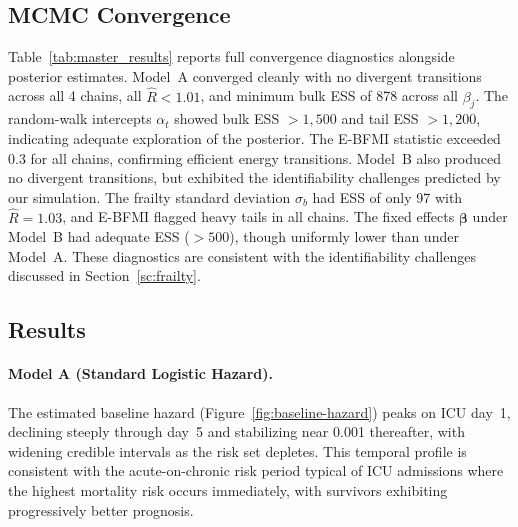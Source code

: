 \documentclass[twoside,11pt]{article}
\begin{document}
 
\subsection{MCMC Convergence}\label{sc:convergence}
Table~\ref{tab:master_results} reports full convergence diagnostics alongside posterior estimates. Model~A converged cleanly with no divergent transitions across all 4 chains, all $\hat{R} < 1.01$, and minimum bulk ESS of 878 across all $\beta_j$. The random-walk intercepts $\alpha_t$ showed bulk ESS $> 1{,}500$ and tail ESS $> 1{,}200$, indicating adequate exploration of the posterior. The E-BFMI statistic exceeded 0.3 for all chains, confirming efficient energy transitions. Model~B also produced no divergent transitions, but exhibited the identifiability challenges predicted by our simulation. The frailty standard deviation $\sigma_b$ had ESS of only 97 with $\hat{R} = 1.03$, and E-BFMI flagged heavy tails in all chains. The fixed effects $\boldsymbol{\beta}$ under Model~B had adequate ESS ($> 500$), though uniformly lower than under Model~A. These diagnostics are consistent with the identifiability challenges discussed in Section~\ref{sc:frailty}.
 
\subsection{Results}
 
\paragraph{Model A (Standard Logistic Hazard).}
The estimated baseline hazard (Figure~\ref{fig:baseline-hazard}) peaks on ICU day~1, declining steeply through day~5 and stabilizing near 0.001 thereafter, with widening credible intervals as the risk set depletes. This temporal profile is consistent with the acute-on-chronic risk period typical of ICU admissions where the highest mortality risk occurs immediately, with survivors exhibiting progressively better prognosis.
 
\end{document}

